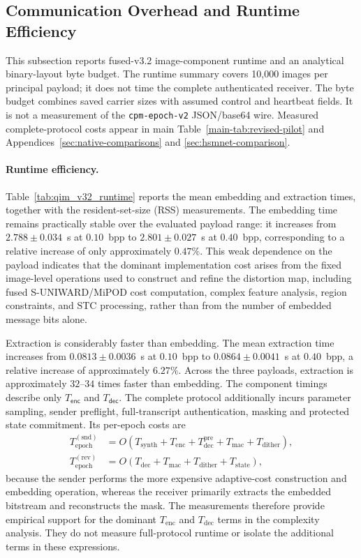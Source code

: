 \documentclass[journal]{IEEEtran}
\theoremstyle{definition}
\theoremstyle{game}
\begin{document}
\subsection{Communication Overhead and Runtime Efficiency}
\label{subsec:runtime_overhead}

This subsection reports fused-v3.2 image-component runtime and an
analytical binary-layout byte budget. The runtime summary covers 10,000
images per principal payload; it does not time the complete authenticated
receiver. The byte budget combines saved carrier sizes with assumed
control and heartbeat fields. It is not a measurement of the
\texttt{cpm-epoch-v2} JSON/base64 wire. Measured complete-protocol costs
appear in main Table~\ref{main-tab:revised-pilot} and
Appendices~\ref{sec:native-comparisons} and \ref{sec:hsmnet-comparison}.

\paragraph{Runtime efficiency.}
Table~\ref{tab:qim_v32_runtime} reports the mean embedding and extraction times, together with the resident-set-size (RSS) measurements. The embedding time remains practically stable over the evaluated payload range: it increases from $2.788\pm0.034$~s at $0.10$~bpp to $2.801\pm0.027$~s at $0.40$~bpp, corresponding to a relative increase of only approximately $0.47\%$. This weak dependence on the payload indicates that the dominant implementation cost arises from the fixed image-level operations used to construct and refine the
distortion map, including fused S-UNIWARD/MiPOD cost computation, complex feature analysis, region constraints, and STC processing, rather than from the number of embedded message bits alone.

Extraction is considerably faster than embedding. The mean
extraction time increases from $0.0813\pm0.0036$~s at
$0.10$~bpp to $0.0864\pm0.0041$~s at $0.40$~bpp, a relative
increase of approximately $6.27\%$. Across the three payloads,
extraction is approximately $32$--$34$ times faster than
embedding. The component timings describe only $T_{\mathsf{enc}}$ and
$T_{\mathsf{dec}}$. The complete protocol additionally incurs parameter
sampling, sender preflight, full-transcript authentication, masking and
protected state commitment. Its per-epoch costs are
\begin{align}
T_{\mathrm{epoch}}^{(\mathrm{snd})}
  &=
  O\!\left(
  T_{\mathrm{synth}}+T_{\mathrm{enc}}+T_{\mathrm{dec}}^{\mathrm{pre}}
  +T_{\mathrm{mac}}+T_{\mathrm{dither}}
  \right),\\
T_{\mathrm{epoch}}^{(\mathrm{rev})}
  &=
  O\!\left(
  T_{\mathrm{dec}}+T_{\mathrm{mac}}+T_{\mathrm{dither}}
  +T_{\mathrm{state}}
  \right),
\end{align}
because the sender performs the more expensive adaptive-cost
construction and embedding operation, whereas the receiver
primarily extracts the embedded bitstream and reconstructs the
mask. The measurements therefore provide empirical support for
the dominant $T_{\mathrm{enc}}$ and $T_{\mathrm{dec}}$ terms in
the complexity analysis. They do not measure full-protocol runtime or isolate the additional
terms in these expressions.
\end{document}
